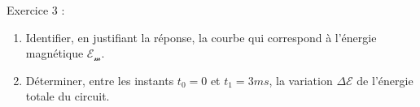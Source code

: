 \documentclass[12pt, french]{article}
\begin{document}
\begin{Box2}{Exercice 3 : }
\begin{enumerate}
	\begin{enumerate}
		\item Identifier, en justifiant la réponse, la courbe qui correspond à l'énergie magnétique $\mathscr{E_m}$.
		\item Déterminer, entre les instants $t_0 = 0$ et $t_1 = 3 ms$, la variation $\Delta{\mathscr{E}}$ de l'énergie totale du circuit.

	\end{enumerate}
\end{enumerate}
\end{Box2}
\end{document}
